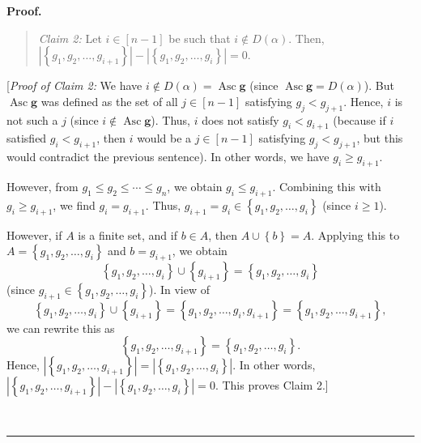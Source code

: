 \documentclass[numbers=enddot,12pt,final,onecolumn,notitlepage]{scrartcl}%
\theoremstyle{definition}
\newenvironment{statement}{\begin{quote}}{\end{quote}}
\newenvironment{proof}[1][Proof]{\noindent\textbf{#1.} }{\ \rule{0.5em}{0.5em}}
\newenvironment{verlong}{}{}
\begin{document}
\begin{verlong}
\begin{proof}
\begin{statement}
\textit{Claim 2:} Let $i\in\left[  n-1\right]  $ be such that $i\notin
D\left(  \alpha\right)  $. Then, $\left\vert \left\{  g_{1},g_{2}%
,\ldots,g_{i+1}\right\}  \right\vert -\left\vert \left\{  g_{1},g_{2}%
,\ldots,g_{i}\right\}  \right\vert =0$.
\end{statement}

[\textit{Proof of Claim 2:} We have $i\notin D\left(  \alpha\right)
=\operatorname*{Asc}\mathbf{g}$ (since $\operatorname*{Asc}\mathbf{g}=D\left(
\alpha\right)  $). But $\operatorname*{Asc}\mathbf{g}$ was defined as the set
of all $j\in\left[  n-1\right]  $ satisfying $g_{j}<g_{j+1}$. Hence, $i$ is
not such a $j$ (since $i\notin\operatorname*{Asc}\mathbf{g}$). Thus, $i$ does
not satisfy $g_{i}<g_{i+1}$ (because if $i$ satisfied $g_{i}<g_{i+1}$, then
$i$ would be a $j\in\left[  n-1\right]  $ satisfying $g_{j}<g_{j+1}$, but this
would contradict the previous sentence). In other words, we have $g_{i}\geq
g_{i+1}$.

However, from $g_{1}\leq g_{2}\leq\cdots\leq g_{n}$, we obtain $g_{i}\leq
g_{i+1}$. Combining this with $g_{i}\geq g_{i+1}$, we find $g_{i}=g_{i+1}$.
Thus, $g_{i+1}=g_{i}\in\left\{  g_{1},g_{2},\ldots,g_{i}\right\}  $ (since
$i\geq1$).

However, if $A$ is a finite set, and if $b\in A$, then $A\cup\left\{
b\right\}  =A$. Applying this to $A=\left\{  g_{1},g_{2},\ldots,g_{i}\right\}
$ and $b=g_{i+1}$, we obtain
\[
\left\{  g_{1},g_{2},\ldots,g_{i}\right\}  \cup\left\{  g_{i+1}\right\}
=\left\{  g_{1},g_{2},\ldots,g_{i}\right\}
\]
(since $g_{i+1}\in\left\{  g_{1},g_{2},\ldots,g_{i}\right\}  $). In view of
\[
\left\{  g_{1},g_{2},\ldots,g_{i}\right\}  \cup\left\{  g_{i+1}\right\}
=\left\{  g_{1},g_{2},\ldots,g_{i},g_{i+1}\right\}  =\left\{  g_{1}%
,g_{2},\ldots,g_{i+1}\right\}  ,
\]
we can rewrite this as%
\[
\left\{  g_{1},g_{2},\ldots,g_{i+1}\right\}  =\left\{  g_{1},g_{2}%
,\ldots,g_{i}\right\}  .
\]
Hence, $\left\vert \left\{  g_{1},g_{2},\ldots,g_{i+1}\right\}  \right\vert
=\left\vert \left\{  g_{1},g_{2},\ldots,g_{i}\right\}  \right\vert $. In other
words, $\left\vert \left\{  g_{1},g_{2},\ldots,g_{i+1}\right\}  \right\vert
-\left\vert \left\{  g_{1},g_{2},\ldots,g_{i}\right\}  \right\vert =0$. This
proves Claim 2.] \medskip


\end{proof}
\end{verlong}
\end{document}
